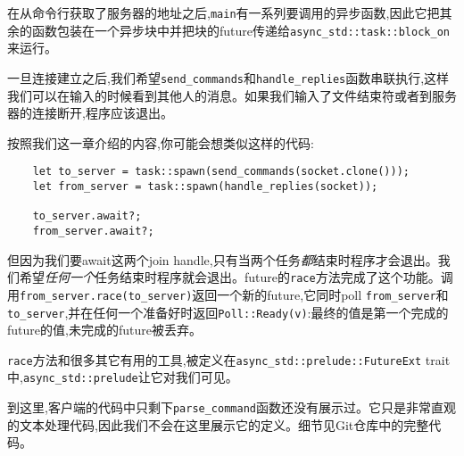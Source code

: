 在从命令行获取了服务器的地址之后,\texttt{main}有一系列要调用的异步函数,因此它把其余的函数包装在一个异步块中并把块的future传递给\texttt{async\_std::task::block\_on}来运行。

一旦连接建立之后,我们希望\texttt{send\_commands}和\texttt{handle\_replies}函数串联执行,这样我们可以在输入的时候看到其他人的消息。如果我们输入了文件结束符或者到服务器的连接断开,程序应该退出。

按照我们这一章介绍的内容,你可能会想类似这样的代码:
\begin{verbatim}
    let to_server = task::spawn(send_commands(socket.clone()));
    let from_server = task::spawn(handle_replies(socket));

    to_server.await?;
    from_server.await?;
\end{verbatim}

但因为我们要await这两个join handle,只有当两个任务\emph{都}结束时程序才会退出。我们希望\emph{任何一个}任务结束时程序就会退出。future的\texttt{race}方法完成了这个功能。调用\texttt{from\_server.race(to\_server)}返回一个新的future,它同时poll \texttt{from\_server}和\texttt{to\_server},并在任何一个准备好时返回\texttt{Poll::Ready(v)}:最终的值是第一个完成的future的值,未完成的future被丢弃。

\texttt{race}方法和很多其它有用的工具,被定义在\texttt{async\_std::prelude::FutureExt} trait中,\texttt{async\_std::prelude}让它对我们可见。

到这里,客户端的代码中只剩下\texttt{parse\_command}函数还没有展示过。它只是非常直观的文本处理代码,因此我们不会在这里展示它的定义。细节见Git仓库中的完整代码。

